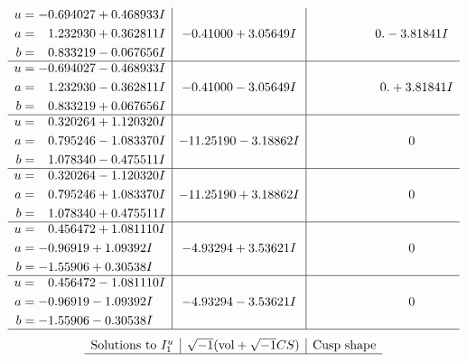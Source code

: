 \documentclass[1p]{elsarticle_modified}
\theoremstyle{definition}
\newcommand{\I}{\sqrt{-1}}
\begin{document}
$$\begin{array}{c|c|c}
\begin{aligned}
u &= -0.694027 + 0.468933 I \\
a &= \phantom{-}1.232930 + 0.362811 I \\
b &= \phantom{-}0.833219 - 0.067656 I\end{aligned}
 & -0.41000 + 3.05649 I & \phantom{-0.000000 } 0. - 3.81841 I \\ \hline\begin{aligned}
u &= -0.694027 - 0.468933 I \\
a &= \phantom{-}1.232930 - 0.362811 I \\
b &= \phantom{-}0.833219 + 0.067656 I\end{aligned}
 & -0.41000 - 3.05649 I & \phantom{-0.000000 -}0. + 3.81841 I \\ \hline\begin{aligned}
u &= \phantom{-}0.320264 + 1.120320 I \\
a &= \phantom{-}0.795246 - 1.083370 I \\
b &= \phantom{-}1.078340 - 0.475511 I\end{aligned}
 & -11.25190 - 3.18862 I & \phantom{-0.000000 } 0 \\ \hline\begin{aligned}
u &= \phantom{-}0.320264 - 1.120320 I \\
a &= \phantom{-}0.795246 + 1.083370 I \\
b &= \phantom{-}1.078340 + 0.475511 I\end{aligned}
 & -11.25190 + 3.18862 I & \phantom{-0.000000 } 0 \\ \hline\begin{aligned}
u &= \phantom{-}0.456472 + 1.081110 I \\
a &= -0.96919 + 1.09392 I \\
b &= -1.55906 + 0.30538 I\end{aligned}
 & -4.93294 + 3.53621 I & \phantom{-0.000000 } 0 \\ \hline\begin{aligned}
u &= \phantom{-}0.456472 - 1.081110 I \\
a &= -0.96919 - 1.09392 I \\
b &= -1.55906 - 0.30538 I\end{aligned}
 & -4.93294 - 3.53621 I & \phantom{-0.000000 } 0\\
 \hline 
 \end{array}$$\newpage$$\begin{array}{c|c|c}  
\text{Solutions to }I^u_{1}& \I (\text{vol} + \sqrt{-1}CS) & \text{Cusp shape}\\
 \hline 

\end{array}$$
\end{document}
